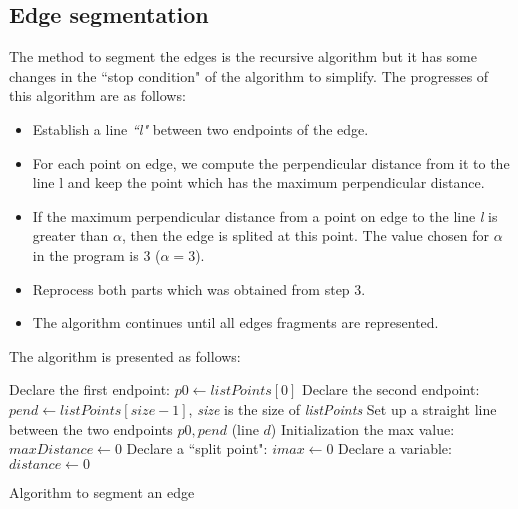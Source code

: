\subsection{Edge segmentation}
The method to segment the edges is the recursive algorithm\cite{thacker1995assessing} but it has some changes in the ``stop condition" of the algorithm to simplify. The progresses of this algorithm are as follows:
\begin{itemize}
\item Establish a line \textit{``l"} between two endpoints of the edge.
\item For each point on edge, we compute the perpendicular distance from it to the line l and keep the point which has the maximum perpendicular distance.
\item If the maximum perpendicular distance from a point on edge to the line \textit{l} is greater than $\alpha$, then the edge is splited at this point. The value chosen for $\alpha$ in the program is 3 ($\alpha = 3$).
\item Reprocess both parts which was obtained from step 3.
\item The algorithm continues until all edges fragments are represented.
\end{itemize}
The algorithm is presented as follows:\\
\IncMargin{1em}
\begin{algorithm}[H]
\Indm 
{}
\SetAlgoLined
{}
\Indp
Declare the first endpoint: $p0 \leftarrow listPoints[0]$\;
Declare the second endpoint: $pend \leftarrow listPoints[size - 1]$, \textit{size} is the size of \textit{listPoints}\;
Set up a straight line between the two endpoints $p0, pend$ (line $d$)\;
Initialization the max value: $maxDistance  \leftarrow 0 $\;
Declare a ``split point": $imax \leftarrow 0$ \; 
Declare a variable: $distance \leftarrow 0$\;

\caption{Algorithm to segment an edge}
\end{algorithm}\DecMargin{1em}
